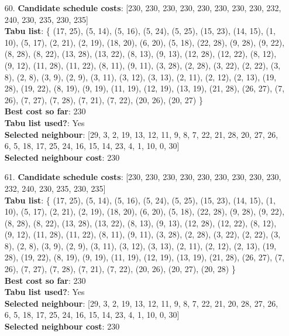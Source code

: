 \documentclass[fleqn]{article}
\begin{document}
\begin{itemize}
    \item[60.] \textbf{Candidate schedule costs}: [230, 230, 230, 230, 230, 230, 230, 230, 232, 240, 230, 235, 230, 235] \\
    \textbf{Tabu list}: \{ (17, 25), (5, 14), (5, 16), (5, 24), (5, 25), (15, 23), (14, 15), (1, 10), (5, 17), (2, 21), (2, 19), (18, 20), (6, 20), (5, 18), (22, 28), (9, 28), (9, 22), (8, 28), (8, 22), (13, 28), (13, 22), (8, 13), (9, 13), (12, 28), (12, 22), (8, 12), (9, 12), (11, 28), (11, 22), (8, 11), (9, 11), (3, 28), (2, 28), (3, 22), (2, 22), (3, 8), (2, 8), (3, 9), (2, 9), (3, 11), (3, 12), (3, 13), (2, 11), (2, 12), (2, 13), (19, 28), (19, 22), (8, 19), (9, 19), (11, 19), (12, 19), (13, 19), (21, 28), (26, 27), (7, 26), (7, 27), (7, 28), (7, 21), (7, 22), (20, 26), (20, 27) \} \\
    \textbf{Best cost so far}: 230 \\
    \textbf{Tabu list used?}: Yes \\
    \textbf{Selected neighbour}: [29, 3, 2, 19, 13, 12, 11, 9, 8, 7, 22, 21, 28, 20, 27, 26, 6, 5, 18, 17, 25, 24, 16, 15, 14, 23, 4, 1, 10, 0, 30] \\
    \textbf{Selected neighbour cost}: 230
      

    \item[61.] \textbf{Candidate schedule costs}: [230, 230, 230, 230, 230, 230, 230, 230, 230, 232, 240, 230, 235, 230, 235] \\
    \textbf{Tabu list}: \{ (17, 25), (5, 14), (5, 16), (5, 24), (5, 25), (15, 23), (14, 15), (1, 10), (5, 17), (2, 21), (2, 19), (18, 20), (6, 20), (5, 18), (22, 28), (9, 28), (9, 22), (8, 28), (8, 22), (13, 28), (13, 22), (8, 13), (9, 13), (12, 28), (12, 22), (8, 12), (9, 12), (11, 28), (11, 22), (8, 11), (9, 11), (3, 28), (2, 28), (3, 22), (2, 22), (3, 8), (2, 8), (3, 9), (2, 9), (3, 11), (3, 12), (3, 13), (2, 11), (2, 12), (2, 13), (19, 28), (19, 22), (8, 19), (9, 19), (11, 19), (12, 19), (13, 19), (21, 28), (26, 27), (7, 26), (7, 27), (7, 28), (7, 21), (7, 22), (20, 26), (20, 27), (20, 28) \} \\
    \textbf{Best cost so far}: 230 \\
    \textbf{Tabu list used?}: Yes \\
    \textbf{Selected neighbour}: [29, 3, 2, 19, 13, 12, 11, 9, 8, 7, 22, 21, 20, 28, 27, 26, 6, 5, 18, 17, 25, 24, 16, 15, 14, 23, 4, 1, 10, 0, 30] \\
    \textbf{Selected neighbour cost}: 230
      


\end{itemize}
\end{document}
